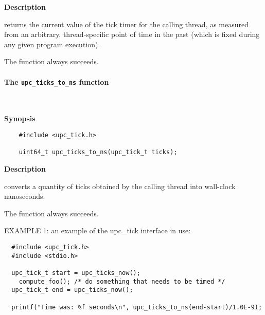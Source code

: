 {\bf Description}

 returns the current value of the tick timer for the calling thread,
as measured from an arbitrary, thread-specific point of time in the past (which is fixed
during any given program execution).

\np The function always succeeds.

\paragraph{The {\tt upc\_ticks\_to\_ns} function}\ \\
\label{upc-ticks-to-ns}

{\bf Synopsis}

\npf\vspace{-2.5em}
 \begin{verbatim}
    #include <upc_tick.h>

    uint64_t upc_ticks_to_ns(upc_tick_t ticks);
\end{verbatim}

{\bf Description}

 converts a quantity of ticks obtained by the
calling thread into wall-clock nanoseconds.

\np The function always succeeds.

\np EXAMPLE 1: an example of the upc\_tick interface in use:
\begin{verbatim}
  #include <upc_tick.h>
  #include <stdio.h>

  upc_tick_t start = upc_ticks_now();
    compute_foo(); /* do something that needs to be timed */
  upc_tick_t end = upc_ticks_now();

  printf("Time was: %f seconds\n", upc_ticks_to_ns(end-start)/1.0E-9);
\end{verbatim}

\cbend
